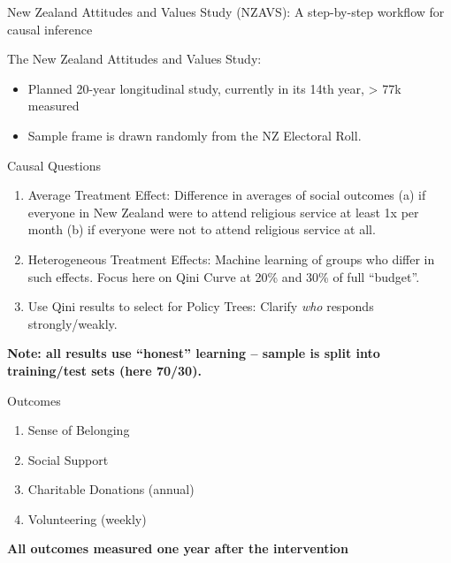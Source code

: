 \documentclass[
  ignorenonframetext,
  aspectratio=169,
]{beamer}
\providecommand{\tightlist}{%
  \setlength{\itemsep}{0pt}\setlength{\parskip}{0pt}}
\begin{document}
\begin{frame}{New Zealand Attitudes and Values Study (NZAVS): A
step-by-step workflow for causal inference}
\label{new-zealand-attitudes-and-values-study-nzavs-a-step-by-step-workflow-for-causal-inference}
\begin{block}{The New Zealand Attitudes and Values Study:}
\label{the-new-zealand-attitudes-and-values-study}
\begin{itemize}
\item
  Planned 20-year longitudinal study, currently in its 14th year,
  \textgreater{} 77k measured
\item
  Sample frame is drawn randomly from the NZ Electoral Roll.
\end{itemize}
\end{block}

\begin{block}{Causal Questions}
\label{causal-questions}
\begin{enumerate}
[1)]
\item
  Average Treatment Effect: Difference in averages of social outcomes
  (a) if everyone in New Zealand were to attend religious service at
  least 1x per month (b) if everyone were not to attend religious
  service at all.
\item
  Heterogeneous Treatment Effects: Machine learning of groups who differ
  in such effects. Focus here on Qini Curve at 20\% and 30\% of full
  ``budget''.
\item
  Use Qini results to select for Policy Trees: Clarify \emph{who}
  responds strongly/weakly.
\end{enumerate}

\textbf{Note: all results use ``honest'' learning -- sample is split
into training/test sets (here 70/30).}
\end{block}

\begin{block}{Outcomes}
\label{outcomes}
\begin{enumerate}
\tightlist
\item
  Sense of Belonging
\item
  Social Support
\item
  Charitable Donations (annual)
\item
  Volunteering (weekly)
\end{enumerate}

\textbf{All outcomes measured one year after the intervention}
\end{block}


\end{frame}
\end{document}
